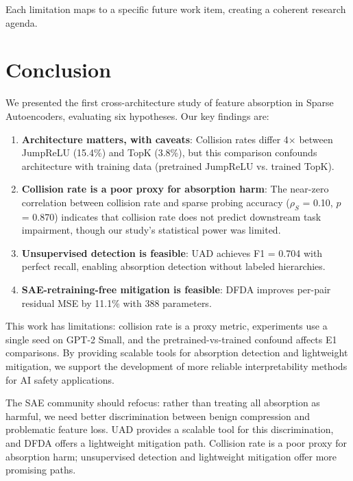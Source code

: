 \documentclass{article}
\begin{document}
Each limitation maps to a specific future work item, creating a coherent research agenda.

\section{Conclusion}

We presented the first cross-architecture study of feature absorption in Sparse Autoencoders, evaluating six hypotheses. Our key findings are:

\begin{enumerate}
    \item \textbf{Architecture matters, with caveats}: Collision rates differ 4$\times$ between JumpReLU (15.4\%) and TopK (3.8\%), but this comparison confounds architecture with training data (pretrained JumpReLU vs. trained TopK).
    \item \textbf{Collision rate is a poor proxy for absorption harm}: The near-zero correlation between collision rate and sparse probing accuracy ($\rho_S$ = 0.10, $p$ = 0.870) indicates that collision rate does not predict downstream task impairment, though our study's statistical power was limited.
    \item \textbf{Unsupervised detection is feasible}: UAD achieves F1 = 0.704 with perfect recall, enabling absorption detection without labeled hierarchies.
    \item \textbf{SAE-retraining-free mitigation is feasible}: DFDA improves per-pair residual MSE by 11.1\% with 388 parameters.
\end{enumerate}

This work has limitations: collision rate is a proxy metric, experiments use a single seed on GPT-2 Small, and the pretrained-vs-trained confound affects E1 comparisons. By providing scalable tools for absorption detection and lightweight mitigation, we support the development of more reliable interpretability methods for AI safety applications.

The SAE community should refocus: rather than treating all absorption as harmful, we need better discrimination between benign compression and problematic feature loss. UAD provides a scalable tool for this discrimination, and DFDA offers a lightweight mitigation path. Collision rate is a poor proxy for absorption harm; unsupervised detection and lightweight mitigation offer more promising paths.



\end{document}
